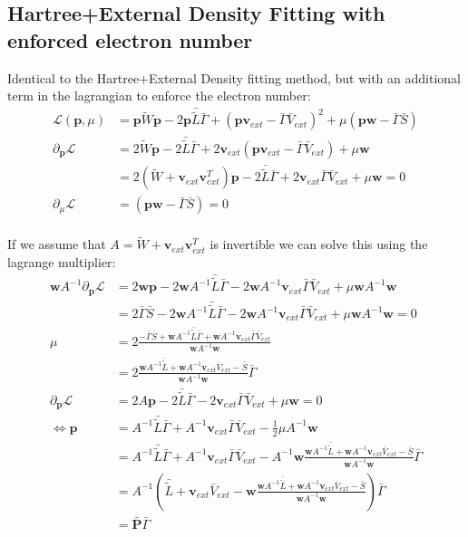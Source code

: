 \subsection{Hartree+External Density Fitting with enforced electron number}
Identical to the Hartree+External Density fitting method, but with an additional term in the lagrangian to enforce the electron number:
\begin{align}
\mathcal{L}(\mathbf{p},\mu) &= \mathbf{p} \tilde{W} \mathbf{p} - 2 \mathbf{p}\bar {\tilde L} \bar\Gamma + (\mathbf{p}\mathbf{v}_{ext}-\bar\Gamma \bar{V}_{ext})^2+\mu(\mathbf{p}\mathbf{w}-\bar\Gamma\bar S)\\
\partial_{\mathbf p}\mathcal L&= 2\tilde{W} \mathbf{p}- 2 \bar {\tilde L} \bar\Gamma + 2\mathbf{v}_{ext}(\mathbf{p}\mathbf{v}_{ext}-\bar\Gamma \bar{V}_{ext})+\mu \mathbf{w}\\
&= 2(\tilde{W}+\mathbf{v}_{ext}\mathbf{v}_{ext}^T) \mathbf{p}- 2 \bar {\tilde L} \bar\Gamma + 2\mathbf{v}_{ext}\bar\Gamma \bar{V}_{ext}+\mu \mathbf{w}= 0\\
\partial_\mu\mathcal{L}&= (\mathbf{p}\mathbf{w}-\bar\Gamma\bar S)=0\\
\end{align}

If we assume that $A=\tilde{W}+\mathbf{v}_{ext}\mathbf{v}_{ext}^T$ is invertible we can solve this using the lagrange multiplier:
\begin{align}
\mathbf{w}A^{-1}\partial_{\mathbf p}\mathcal L&= 2 \mathbf{w}\mathbf{p}-2 \mathbf{w}A^{-1}\bar {\tilde L} \bar\Gamma-2\mathbf{w}A^{-1}\mathbf{v}_{ext}\bar\Gamma \bar{V}_{ext} + \mu \mathbf{w}A^{-1}\mathbf{w}\\
&=2\bar\Gamma\bar S -2 \mathbf{w}A^{-1}\bar {\tilde L} \bar\Gamma-2\mathbf{w}A^{-1}\mathbf{v}_{ext}\bar\Gamma \bar{V}_{ext} + \mu \mathbf{w}A^{-1}\mathbf{w}=0\\
\mu &= 2\frac{-\bar\Gamma\bar S + \mathbf{w}A^{-1}\bar {\tilde L} \bar\Gamma+\mathbf{w}A^{-1}\mathbf{v}_{ext}\bar\Gamma \bar{V}_{ext}}{\mathbf{w}A^{-1}\mathbf{w}}\\
&=2\frac{\mathbf{w}A^{-1}\bar {\tilde L} +\mathbf{w}A^{-1}\mathbf{v}_{ext} \bar{V}_{ext}-\bar S}{\mathbf{w}A^{-1}\mathbf{w}}\bar\Gamma\\
\partial_{\mathbf p}\mathcal L&= 2A\mathbf{p}- 2 \bar {\tilde L} \bar\Gamma - 2\mathbf{v}_{ext}\bar\Gamma \bar{V}_{ext}+\mu \mathbf{w}=0\\
\Leftrightarrow\mathbf p&=A^{-1}\bar {\tilde L} \bar\Gamma + A^{-1}\mathbf{v}_{ext}\bar\Gamma \bar{V}_{ext}-\frac{1}{2}\mu A^{-1}\mathbf{w}\\
&=A^{-1}\bar {\tilde L} \bar\Gamma + A^{-1}\mathbf{v}_{ext}\bar\Gamma \bar{V}_{ext}- A^{-1}\mathbf{w}\frac{\mathbf{w}A^{-1}\bar {\tilde L} +\mathbf{w}A^{-1}\mathbf{v}_{ext} \bar{V}_{ext}-\bar S}{\mathbf{w}A^{-1}\mathbf{w}}\bar\Gamma\\
&=A^{-1}\left(\bar {\tilde L} + \mathbf{v}_{ext} \bar{V}_{ext}- \mathbf{w}\frac{\mathbf{w}A^{-1}\bar {\tilde L} +\mathbf{w}A^{-1}\mathbf{v}_{ext} \bar{V}_{ext}-\bar S}{\mathbf{w}A^{-1}\mathbf{w}}\right)\bar\Gamma\\
&= \bar {\mathbf{P}}\bar\Gamma
\end{align}
